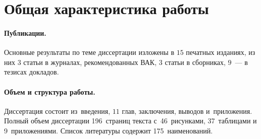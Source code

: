 \section*{Общая характеристика работы}
\fontsize{14.5pt}{15.5pt}\selectfont


\paragraph{Публикации.} Основные результаты по теме диссертации изложены в $15$ печатных изданиях, из них $3$ статьи в журналах, рекомендованных ВАК, $3$ статьи в сборниках, $9$~--- в тезисах докладов.

\paragraph{Объем и структура работы.} Диссертация состоит из~введения, $11$ глав, заключения, выводов и~приложения. Полный объем диссертации 196~страниц текста с~46~рисунками, 37~таблицами и 9~приложениями. Список литературы содержит 175~наименований.

